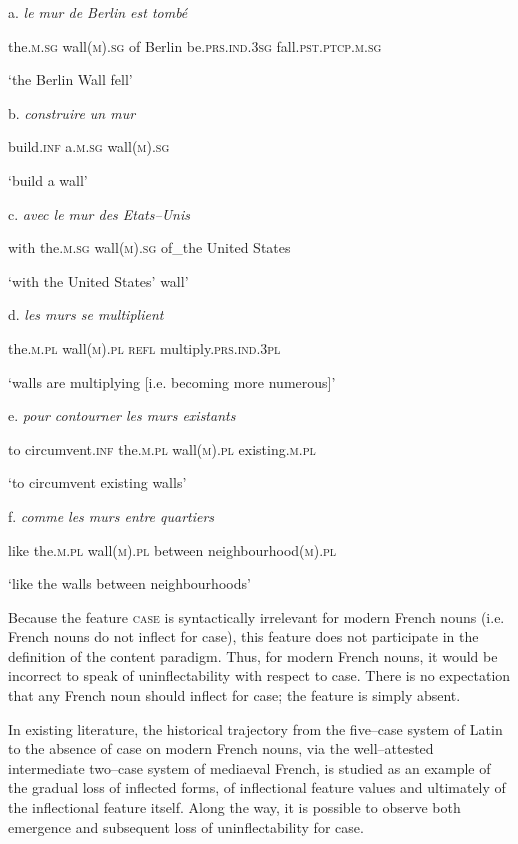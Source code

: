 \documentclass[output=paper]{langscibook}
\begin{document}
          a.  \textit{le   mur   de   Berlin   est     tombé} 

    the.\textsc{m.sg} wall\textsc{(m).sg} of Berlin be.\textsc{prs.ind.3sg} fall\textsc{.pst.ptcp.m.sg}

    ‘the Berlin Wall fell’

  b.  \textit{construire   un     mur} 

    build.\textsc{inf}   a.\textsc{m.sg}    wall\textsc{(m).sg}

    ‘build a wall’

  c.  \textit{avec     le     mur     des     Etats–Unis}

    with    the.\textsc{m.sg}  wall\textsc{(m).sg}  of\_the    United States

    ‘with the United States’ wall’

  d.  \textit{les     murs     se   multiplient}

    the.\textsc{m.pl}  wall\textsc{(m).pl}  \textsc{refl}   multiply.\textsc{prs.ind.3pl}

    ‘walls are multiplying [i.e. becoming more numerous]’

  e.  \textit{pour   contourner   les     murs     existants}

    to  circumvent.\textsc{inf}  the.\textsc{m.pl}  wall\textsc{(m).pl}  existing.\textsc{m.pl}

    ‘to circumvent existing walls’

  f.  \textit{comme     les     murs     entre     quartiers}

    like    the.\textsc{m.pl}  wall\textsc{(m).pl}  between  neighbourhood(\textsc{m).pl}

    ‘like the walls between neighbourhoods’

Because the feature \textsc{case} is syntactically irrelevant for modern French nouns (i.e. French nouns do not inflect for case), this feature does not participate in the definition of the content paradigm. Thus, for modern French nouns, it would be incorrect to speak of uninflectability with respect to case. There is no expectation that any French noun should inflect for case; the feature is simply absent. 

In existing literature, the historical trajectory from the five–case system of Latin to the absence of case on modern French nouns, via the well–attested intermediate two–case system of mediaeval French, is studied as an example of the gradual loss of inflected forms, of inflectional feature values and ultimately of the inflectional feature itself. Along the way, it is possible to observe both emergence and subsequent loss of uninflectability for case.
\end{document}
